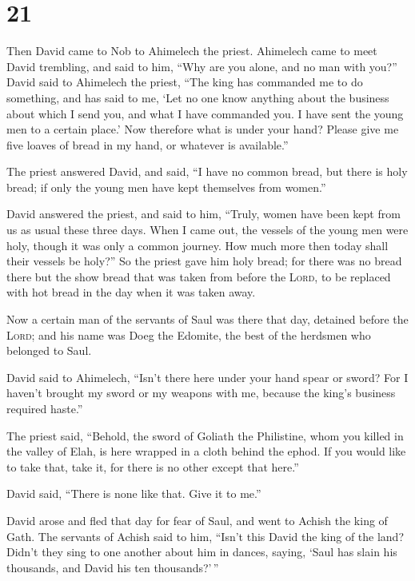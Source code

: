 \hypertarget{section-20}{%
\section{21}\label{section-20}}

 Then David came to Nob to Ahimelech the priest. Ahimelech
came to meet David trembling, and said to him, ``Why are you alone, and
no man with you?''  David said to Ahimelech the priest,
``The king has commanded me to do something, and has said to me, `Let no
one know anything about the business about which I send you, and what I
have commanded you. I have sent the young men to a certain place.'
 Now therefore what is under your hand? Please give me
five loaves of bread in my hand, or whatever is available.''

 The priest answered David, and said, ``I have no common
bread, but there is holy bread; if only the young men have kept
themselves from women.''

 David answered the priest, and said to him, ``Truly,
women have been kept from us as usual these three days. When I came out,
the vessels of the young men were holy, though it was only a common
journey. How much more then today shall their vessels be holy?''
 So the priest gave him holy bread; for there was no bread
there but the show bread that was taken from before the \textsc{Lord},
to be replaced with hot bread in the day when it was taken away.

 Now a certain man of the servants of Saul was there that
day, detained before the \textsc{Lord}; and his name was Doeg the
Edomite, the best of the herdsmen who belonged to Saul.

 David said to Ahimelech, ``Isn't there here under your
hand spear or sword? For I haven't brought my sword or my weapons with
me, because the king's business required haste.''

 The priest said, ``Behold, the sword of Goliath the
Philistine, whom you killed in the valley of Elah, is here wrapped in a
cloth behind the ephod. If you would like to take that, take it, for
there is no other except that here.''

David said, ``There is none like that. Give it to me.''

 David arose and fled that day for fear of Saul, and went
to Achish the king of Gath.  The servants of Achish said
to him, ``Isn't this David the king of the land? Didn't they sing to one
another about him in dances, saying, `Saul has slain his thousands, and
David his ten thousands?'\,''

